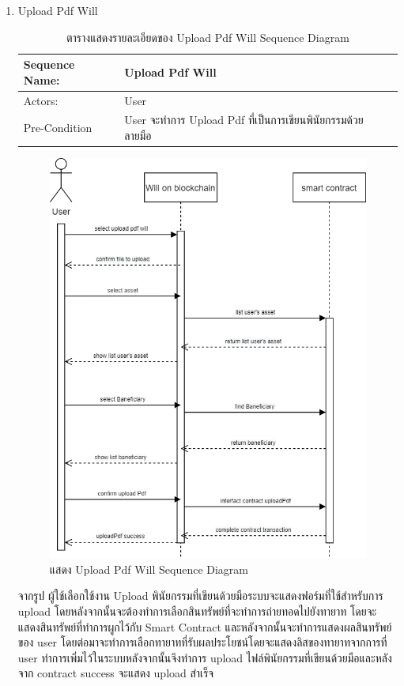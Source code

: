 \documentclass[12pt,oneside,openright,a4paper]{cpe-thai-project}
\begin{document}
\begin{enumerate}[label=\thesubsection.\arabic*,leftmargin=0pt,itemindent=1.25cm]
\clearpage
	\item Upload Pdf Will
		\begin{table}[h]
		\centering
		\caption{ตารางแสดงรายละเอียดของ Upload Pdf Will Sequence Diagram}
		\begin{tabularx}{\textwidth}{|l|X|X|} 
			\hline
			Sequence Name: & Upload Pdf Will                                             \\ 
			\hline
			Actors:        & User                                                        \\ 
			\hline
			Pre-Condition  & User จะทำการ Upload Pdf ที่เป็นการเขียนพินัยกรรมด้วยลายมือ  \\
			\hline
		\end{tabularx}
		\end{table}
		\begin{figure}[!thb]
			\centering
			\includegraphics[scale=0.55]{uploadPdfWillseq}
			\caption{แสดง Upload Pdf Will Sequence Diagram}
		\end{figure}
		\FloatBarrier
	\tab จากรูป ผู้ใช้เลือกใช้งาน Upload พินัยกรรมที่เขียนด้วยมือระบบจะแสดงฟอร์มที่ใช้สำหรับการ upload โดยหลังจากนั้นจะต้องทำการเลือกสินทรัพย์ที่จะทำการถ่ายทอดไปยังทายาท โดยจะแสดงสินทรัพย์ที่ทำการผูกไว้กับ Smart Contract และหลังจากนั้นจะทำการแสดงผลสินทรัพย์ของ user โดยต่อมาจะทำการเลือกทายาทที่รับผลประโยชน์โดยจะแสดงลิสของทายาทจากการที่ user ทำการเพิ่มไว้ในระบบหลังจากนั้นจึงทำการ upload ไฟล์พินัยกรรมที่เขียนด้วยมือและหลังจาก contract success จะแสดง upload สำเร็จ

\end{enumerate}
\end{document}
